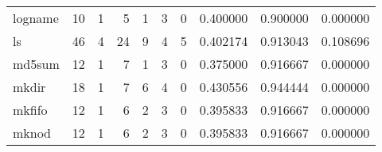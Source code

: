 \begin{tabular}{lrrrrrrrrr}
logname   &                                       10 &                                                  1 &                                                  5 &                                                  1 &                                                  3 &                                                  0 &                                           0.400000 &                               0.900000 &                             0.000000 \\
ls        &                                       46 &                                                  4 &                                                 24 &                                                  9 &                                                  4 &                                                  5 &                                           0.402174 &                               0.913043 &                             0.108696 \\
md5sum    &                                       12 &                                                  1 &                                                  7 &                                                  1 &                                                  3 &                                                  0 &                                           0.375000 &                               0.916667 &                             0.000000 \\
mkdir     &                                       18 &                                                  1 &                                                  7 &                                                  6 &                                                  4 &                                                  0 &                                           0.430556 &                               0.944444 &                             0.000000 \\
mkfifo    &                                       12 &                                                  1 &                                                  6 &                                                  2 &                                                  3 &                                                  0 &                                           0.395833 &                               0.916667 &                             0.000000 \\
mknod     &                                       12 &                                                  1 &                                                  6 &                                                  2 &                                                  3 &                                                  0 &                                           0.395833 &                               0.916667 &                             0.000000 \\

\end{tabular}
